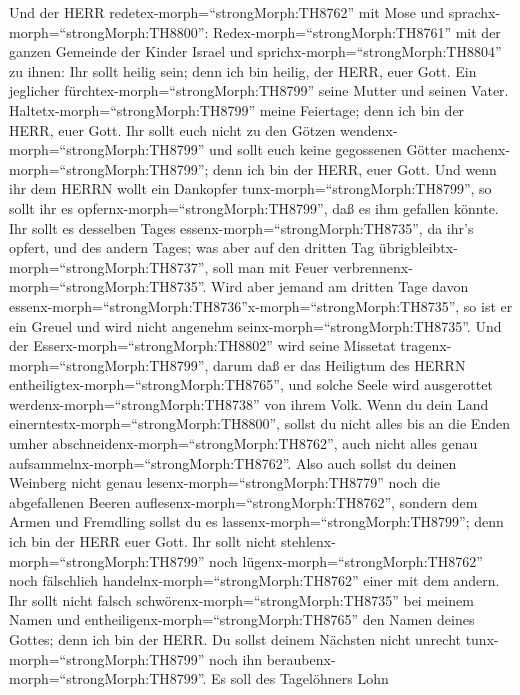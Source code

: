  Und der HERR redetex-morph=``strongMorph:TH8762'' mit Mose
und sprachx-morph=``strongMorph:TH8800'': 
Redex-morph=``strongMorph:TH8761'' mit der ganzen Gemeinde der Kinder
Israel und sprichx-morph=``strongMorph:TH8804'' zu ihnen: Ihr sollt
heilig sein; denn ich bin heilig, der HERR, euer Gott.  Ein
jeglicher fürchtex-morph=``strongMorph:TH8799'' seine Mutter und seinen
Vater. Haltetx-morph=``strongMorph:TH8799'' meine Feiertage; denn ich
bin der HERR, euer Gott.  Ihr sollt euch nicht zu den Götzen
wendenx-morph=``strongMorph:TH8799'' und sollt euch keine gegossenen
Götter machenx-morph=``strongMorph:TH8799''; denn ich bin der HERR, euer
Gott.  Und wenn ihr dem HERRN wollt ein Dankopfer
tunx-morph=``strongMorph:TH8799'', so sollt ihr es
opfernx-morph=``strongMorph:TH8799'', daß es ihm gefallen könnte.
 Ihr sollt es desselben Tages
essenx-morph=``strongMorph:TH8735'', da ihr's opfert, und des andern
Tages; was aber auf den dritten Tag
übrigbleibtx-morph=``strongMorph:TH8737'', soll man mit Feuer
verbrennenx-morph=``strongMorph:TH8735''.  Wird aber jemand
am dritten Tage davon
essenx-morph=``strongMorph:TH8736''x-morph=``strongMorph:TH8735'', so
ist er ein Greuel und wird nicht angenehm
seinx-morph=``strongMorph:TH8735''.  Und der
Esserx-morph=``strongMorph:TH8802'' wird seine Missetat
tragenx-morph=``strongMorph:TH8799'', darum daß er das Heiligtum des
HERRN entheiligtex-morph=``strongMorph:TH8765'', und solche Seele wird
ausgerottet werdenx-morph=``strongMorph:TH8738'' von ihrem Volk.
 Wenn du dein Land einerntestx-morph=``strongMorph:TH8800'',
sollst du nicht alles bis an die Enden umher
abschneidenx-morph=``strongMorph:TH8762'', auch nicht alles genau
aufsammelnx-morph=``strongMorph:TH8762''.  Also auch sollst
du deinen Weinberg nicht genau lesenx-morph=``strongMorph:TH8779'' noch
die abgefallenen Beeren auflesenx-morph=``strongMorph:TH8762'', sondern
dem Armen und Fremdling sollst du es
lassenx-morph=``strongMorph:TH8799''; denn ich bin der HERR euer Gott.
 Ihr sollt nicht stehlenx-morph=``strongMorph:TH8799'' noch
lügenx-morph=``strongMorph:TH8762'' noch fälschlich
handelnx-morph=``strongMorph:TH8762'' einer mit dem andern.
 Ihr sollt nicht falsch
schwörenx-morph=``strongMorph:TH8735'' bei meinem Namen und
entheiligenx-morph=``strongMorph:TH8765'' den Namen deines Gottes; denn
ich bin der HERR.  Du sollst deinem Nächsten nicht unrecht
tunx-morph=``strongMorph:TH8799'' noch ihn
beraubenx-morph=``strongMorph:TH8799''. Es soll des Tagelöhners Lohn
